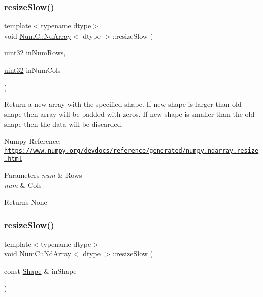 \subsubsection{\texorpdfstring{resize\+Slow()}{resizeSlow()}\hspace{0.1cm}{\footnotesize\ttfamily [1/2]}}
{\footnotesize\ttfamily template$<$typename dtype$>$ \\
void \mbox{\hyperlink{class_num_c_1_1_nd_array}{Num\+C\+::\+Nd\+Array}}$<$ dtype $>$\+::resize\+Slow (\begin{DoxyParamCaption}\item[{\mbox{\hyperlink{namespace_num_c_ae685802ca6d3035f2b400b081e3953fa}{uint32}}}]{in\+Num\+Rows,  }\item[{\mbox{\hyperlink{namespace_num_c_ae685802ca6d3035f2b400b081e3953fa}{uint32}}}]{in\+Num\+Cols }\end{DoxyParamCaption})\hspace{0.3cm}{\ttfamily [inline]}}

Return a new array with the specified shape. If new shape is larger than old shape then array will be padded with zeros. If new shape is smaller than the old shape then the data will be discarded.

Numpy Reference\+: \href{https://www.numpy.org/devdocs/reference/generated/numpy.ndarray.resize.html}{\tt https\+://www.\+numpy.\+org/devdocs/reference/generated/numpy.\+ndarray.\+resize.\+html}


\begin{DoxyParams}{Parameters}
{\em num} & Rows \\
\hline
{\em num} & Cols \\
\hline
\end{DoxyParams}
\begin{DoxyReturn}{Returns}
None 
\end{DoxyReturn}
\mbox{\label{class_num_c_1_1_nd_array_a5a73a3515f3be49f89af26ae3103c2a8}} 
\subsubsection{\texorpdfstring{resize\+Slow()}{resizeSlow()}\hspace{0.1cm}{\footnotesize\ttfamily [2/2]}}
{\footnotesize\ttfamily template$<$typename dtype$>$ \\
void \mbox{\hyperlink{class_num_c_1_1_nd_array}{Num\+C\+::\+Nd\+Array}}$<$ dtype $>$\+::resize\+Slow (\begin{DoxyParamCaption}\item[{const \mbox{\hyperlink{class_num_c_1_1_shape}{Shape}} \&}]{in\+Shape }\end{DoxyParamCaption})\hspace{0.3cm}{\ttfamily [inline]}}

